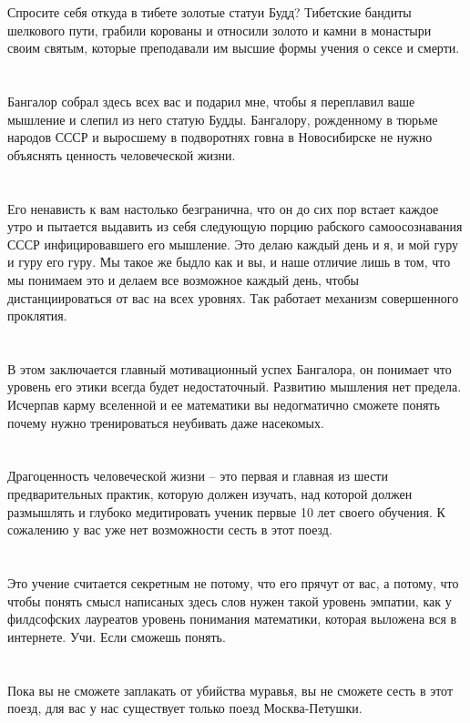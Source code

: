 Спросите себя откуда в тибете золотые статуи Будд? Тибетские бандиты шелкового пути, грабили корованы и относили золото и камни в монастыри своим святым, которые преподавали им высшие формы учения о сексе и смерти.\\
\\
\\
Бангалор собрал здесь всех вас и подарил мне, чтобы я переплавил ваше мышление и слепил из него статую Будды. Бангалору, рожденному в тюрьме народов СССР и выросшему в подворотнях говна в Новосибирске не нужно объяснять ценность человеческой жизни.\\
\\
\\
Его ненависть к вам настолько безгранична, что он до сих пор встает каждое утро и пытается выдавить из себя следующую порцию рабского самоосознавания СССР инфицировавшего его мышление. Это делаю каждый день и я, и мой гуру и гуру его гуру. Мы такое же быдло как и вы, и наше отличие лишь в том, что мы понимаем это и делаем все возможное каждый день, чтобы дистанциироваться от вас на всех уровнях. Так работает механизм совершенного проклятия.\\
\\
\\
В этом заключается главный мотивационный успех Бангалора, он понимает что уровень его этики всегда будет недостаточный. Развитию мышления нет предела. Исчерпав карму вселенной и ее математики вы недогматично сможете понять почему нужно тренироваться неубивать даже насекомых.\\
\\
\\
Драгоценность человеческой жизни -- это первая и главная из шести предварительных практик, которую должен изучать, над которой должен размышлять и глубоко медитировать ученик первые 10 лет своего обучения. К сожалению у вас уже нет возможности сесть в этот поезд.\\
\\
\\
Это учение считается секретным не потому, что его прячут от вас, а потому, что чтобы понять смысл написаных здесь слов нужен такой уровень эмпатии, как у филдсофских лауреатов уровень понимания математики, которая выложена вся в интернете. Учи. Если сможешь понять.\\
\\
\\
Пока вы не сможете заплакать от убийства муравья, вы не сможете сесть в этот поезд, для вас у нас существует только поезд Москва-Петушки.\\

